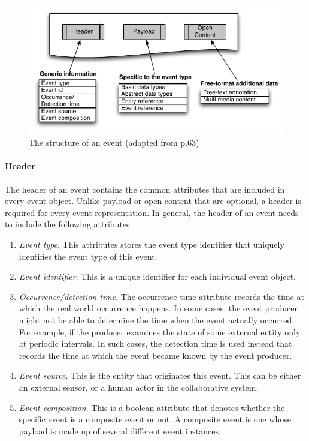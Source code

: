 \begin{figure}[htbp] %
   \centering
   \includegraphics{event_structure.pdf} 
   \caption{The structure of an event (adapted from \cite{Etzion2010} p.63)}
   \label{fig:event_structure}
\end{figure}

\paragraph*{Header} %
\label{par:header}
The header of an event contains the common attributes that are included in every event object. Unlike payload or open content that are optional, a header is required for every event representation. In general, the header of an event needs to include the following attributes:

\begin{enumerate}
	\item \emph{Event type}. This attributes stores the event type identifier that uniquely identifies the event type of this event.
	\item \emph{Event identifier}. This is a unique identifier for each individual event object.
	\item \emph{Occurrence/detection time}. The occurrence time attribute records the time at which the real world occurrence happens. In some cases, the event producer might not be able to determine the time when the event actually occurred. For example, if the producer examines the state of some external entity only at periodic intervals. In such cases, the detection time is used instead that records the time at which the event became known by the event producer. 
	\item \emph{Event source}. This is the entity that originates this event. This can be either an external sensor, or a human actor in the collaborative system.
	\item \emph{Event composition}. This is a boolean attribute that denotes whether the specific event is a composite event or not. A composite event is one whose payload is made up of several different event instances.
\end{enumerate}

